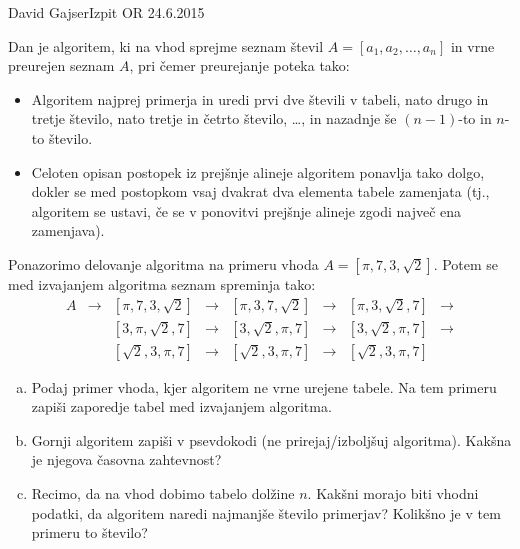 \begin{naloga}{David Gajser}{Izpit OR 24.6.2015}
\begin{vprasanje}
Dan je algoritem, ki na vhod sprejme seznam števil
$A = [a_1, a_2, \dots, a_n]$
in vrne preurejen seznam $A$,
pri čemer preurejanje poteka tako:
\begin{itemize}
\item Algoritem najprej primerja in uredi prvi dve števili v tabeli,
nato drugo in tretje število, nato tretje in četrto število, \dots,
in nazadnje še $(n-1)$-to in $n$-to število.
\item Celoten opisan postopek iz prejšnje alineje
algoritem ponavlja tako dolgo,
dokler se med postopkom vsaj dvakrat dva elementa tabele zamenjata
(tj., algoritem se ustavi,
če se v ponovitvi prejšnje alineje zgodi največ ena zamenjava).
\end{itemize}

Ponazorimo delovanje algoritma na primeru vhoda $A = [\pi, 7, 3, \sqrt{2}]$.
Potem se med izvajanjem algoritma seznam spreminja tako:
$$
\begin{array}{cccccccc}
A &\to& [\pi, 7, 3, \sqrt{2}]
  &\to& [\pi, 3, 7, \sqrt{2}]
  &\to& [\pi, 3, \sqrt{2}, 7] &\to \\
  &   & [3, \pi, \sqrt{2}, 7]
  &\to& [3, \sqrt{2}, \pi, 7]
  &\to& [3, \sqrt{2}, \pi, 7] &\to \\
  &   & [\sqrt{2}, 3, \pi, 7]
  &\to& [\sqrt{2}, 3, \pi, 7]
  &\to& [\sqrt{2}, 3, \pi, 7]
\end{array}
$$

\begin{enumerate}[(a)]
\item Podaj primer vhoda, kjer algoritem ne vrne urejene tabele.
Na tem primeru zapiši zaporedje tabel med izvajanjem algoritma.

\item Gornji algoritem zapiši v psevdokodi (ne prirejaj/izboljšuj algoritma).
Kakšna je njegova časovna zahtevnost?

\item Recimo, da na vhod dobimo tabelo dolžine $n$.
Kakšni morajo biti vhodni podatki,
da algoritem naredi najmanjše število primerjav?
Kolikšno je v tem primeru to število?
\end{enumerate}
\end{vprasanje}
\begin{odgovor}
\end{odgovor}
\end{naloga}
